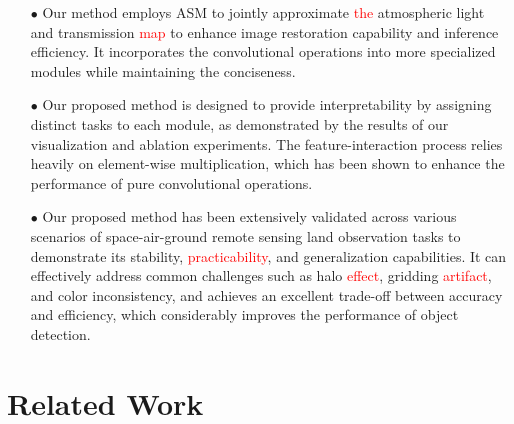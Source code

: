 \documentclass[lettersize,journal]{IEEEtran}
\begin{document}
\begin{itemize}
    \item[$\bullet$] Our method employs ASM to jointly approximate \textcolor{red}{the} atmospheric light and transmission \textcolor{red}{map} to enhance image restoration capability and inference efficiency. It incorporates the convolutional operations into more specialized modules while maintaining the conciseness.
    \item[$\bullet$] Our proposed method is designed to provide interpretability by assigning distinct tasks to each module, as demonstrated by the results of our visualization and ablation experiments. The feature-interaction process relies heavily on element-wise multiplication, which has been shown to enhance the performance of pure convolutional operations.
    \item[$\bullet$] Our proposed method has been extensively validated across various scenarios of space-air-ground remote sensing land observation tasks to demonstrate its stability, \textcolor{red}{practicability}, and generalization capabilities. It can effectively address common challenges such as halo \textcolor{red}{effect}, gridding \textcolor{red}{artifact}, and color inconsistency, and achieves an excellent trade-off between accuracy and efficiency, which considerably improves the performance of object detection.

\end{itemize}

\section{Related Work}
\label{sec:2}
\end{document}
